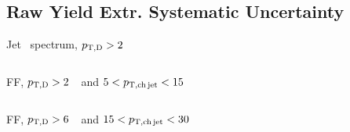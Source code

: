 \documentclass[xcolor={usenames,dvipsnames}]{beamer}
\begin{document}
\subsection{Raw Yield Extr. Systematic Uncertainty}

\begin{frame}{Jet \pt\ spectrum, $p_{\mathrm{T,D}}>2$~\GeVc}
\begin{columns}
\end{columns}
\end{frame}

\begin{frame}{FF, $p_{\mathrm{T,D}}>2$~\GeVc\ and $5<p_{\mathrm{T,ch\, jet}}<15$~\GeVc}
\begin{columns}
\end{columns}
\end{frame}

\begin{frame}{FF, $p_{\mathrm{T,D}}>6$~\GeVc\ and $15<p_{\mathrm{T,ch\, jet}}<30$~\GeVc}
\begin{columns}
\end{columns}
\end{frame}
\end{document}
